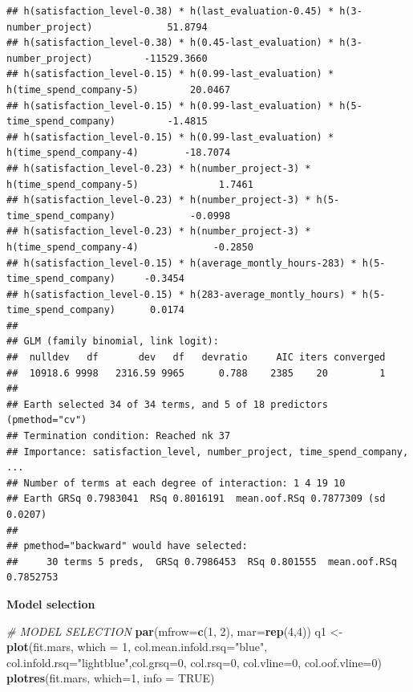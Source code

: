 \documentclass[
  11pt,
]{article}
\newenvironment{Shaded}{\begin{snugshade}}{\end{snugshade}}
\newcommand{\AttributeTok}[1]{\textcolor[rgb]{0.13,0.29,0.53}{#1}}
\newcommand{\CommentTok}[1]{\textcolor[rgb]{0.56,0.35,0.01}{\textit{#1}}}
\newcommand{\ConstantTok}[1]{\textcolor[rgb]{0.56,0.35,0.01}{#1}}
\newcommand{\DecValTok}[1]{\textcolor[rgb]{0.00,0.00,0.81}{#1}}
\newcommand{\FunctionTok}[1]{\textcolor[rgb]{0.13,0.29,0.53}{\textbf{#1}}}
\newcommand{\NormalTok}[1]{#1}
\newcommand{\OtherTok}[1]{\textcolor[rgb]{0.56,0.35,0.01}{#1}}
\newcommand{\StringTok}[1]{\textcolor[rgb]{0.31,0.60,0.02}{#1}}
\begin{document}
\begin{verbatim}
## h(satisfaction_level-0.38) * h(last_evaluation-0.45) * h(3-number_project)             51.8794
## h(satisfaction_level-0.38) * h(0.45-last_evaluation) * h(3-number_project)         -11529.3660
## h(satisfaction_level-0.15) * h(0.99-last_evaluation) * h(time_spend_company-5)         20.0467
## h(satisfaction_level-0.15) * h(0.99-last_evaluation) * h(5-time_spend_company)         -1.4815
## h(satisfaction_level-0.15) * h(0.99-last_evaluation) * h(time_spend_company-4)        -18.7074
## h(satisfaction_level-0.23) * h(number_project-3) * h(time_spend_company-5)              1.7461
## h(satisfaction_level-0.23) * h(number_project-3) * h(5-time_spend_company)             -0.0998
## h(satisfaction_level-0.23) * h(number_project-3) * h(time_spend_company-4)             -0.2850
## h(satisfaction_level-0.15) * h(average_montly_hours-283) * h(5-time_spend_company)     -0.3454
## h(satisfaction_level-0.15) * h(283-average_montly_hours) * h(5-time_spend_company)      0.0174
## 
## GLM (family binomial, link logit):
##  nulldev   df       dev   df   devratio     AIC iters converged
##  10918.6 9998   2316.59 9965      0.788    2385    20         1
## 
## Earth selected 34 of 34 terms, and 5 of 18 predictors (pmethod="cv")
## Termination condition: Reached nk 37
## Importance: satisfaction_level, number_project, time_spend_company, ...
## Number of terms at each degree of interaction: 1 4 19 10
## Earth GRSq 0.7983041  RSq 0.8016191  mean.oof.RSq 0.7877309 (sd 0.0207)
## 
## pmethod="backward" would have selected:
##     30 terms 5 preds,  GRSq 0.7986453  RSq 0.801555  mean.oof.RSq 0.7852753
\end{verbatim}

\textbf{Model selection}

\begin{Shaded}
\begin{Highlighting}[]
\CommentTok{\# MODEL SELECTION}
\FunctionTok{par}\NormalTok{(}\AttributeTok{mfrow=}\FunctionTok{c}\NormalTok{(}\DecValTok{1}\NormalTok{, }\DecValTok{2}\NormalTok{), }\AttributeTok{mar=}\FunctionTok{rep}\NormalTok{(}\DecValTok{4}\NormalTok{,}\DecValTok{4}\NormalTok{))}
\NormalTok{q1 }\OtherTok{\textless{}{-}} \FunctionTok{plot}\NormalTok{(fit.mars, }\AttributeTok{which =} \DecValTok{1}\NormalTok{, }\AttributeTok{col.mean.infold.rsq=}\StringTok{"blue"}\NormalTok{, }
           \AttributeTok{col.infold.rsq=}\StringTok{"lightblue"}\NormalTok{,}\AttributeTok{col.grsq=}\DecValTok{0}\NormalTok{, }\AttributeTok{col.rsq=}\DecValTok{0}\NormalTok{, }
           \AttributeTok{col.vline=}\DecValTok{0}\NormalTok{, }\AttributeTok{col.oof.vline=}\DecValTok{0}\NormalTok{)}
\FunctionTok{plotres}\NormalTok{(fit.mars, }\AttributeTok{which=}\DecValTok{1}\NormalTok{, }\AttributeTok{info =} \ConstantTok{TRUE}\NormalTok{)}
\end{Highlighting}
\end{Shaded}
\end{document}
